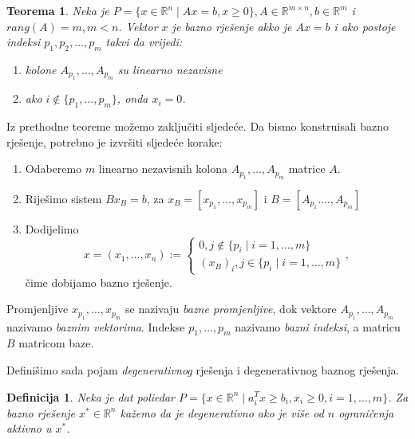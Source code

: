 \documentclass[a4paper, utf8, 11pt, colorlinks]{book}
\newtheorem{definition}{Definicija}[chapter]
\newtheorem{thm}{Teorema}[chapter]
\theoremstyle{definition}
\begin{document}
\begin{thm}
   Neka je $P = \{ x \in \mathbb{R}^n \mid A x = b, x \geq 0\}, A \in \mathbb{R}^{m \times n}, b \in \mathbb{R}^m$ i $rang(A)= m, m < n$.
   Vektor $x$ je bazno rješenje  akko je $A x = b$ i ako postoje indeksi $p_1,p_2,\ldots, p_m$ takvi da vrijedi:
   \begin{enumerate}
       \item kolone $A_{p_1},\ldots, A_{p_m}$ su linearno nezavisne
       \item ako $i \notin \{p_1,\ldots, p_m\}$, onda $x_i = 0$.
   \end{enumerate}
   
\end{thm}
Iz prethodne teoreme možemo zaključiti sljedeće.  Da bismo  konstruisali bazno rješenje, potrebno je izvršiti sljedeće korake:
\begin{enumerate}
    \item Odaberemo $m$ linearno nezavisnih kolona $A_{p_1}, \ldots, A_{p_m}$ matrice $A$.
    \item Riješimo sistem $B x_B = b$, za $x_B = [x_{p_1}, \ldots, x_{p_m}]$ i $B= [A_{p_1}. \ldots, A_{p_m}]$
    \item Dodijelimo $$x = (x_1,\ldots, x_n):= \begin{cases}
    	          0, j  \not   \in \{ p_i \mid i=1,\ldots, m\} \\
    	          (x_B)_i, j \in \{ p_i \mid i=1,\ldots, m\}
    \end{cases},$$  čime dobijamo bazno rješenje. 

\end{enumerate}
 
Promjenljive $x_{p_1},\ldots, x_{p_m}$ se nazivaju \emph{bazne promjenljive}, dok vektore $A_{p_1}, \ldots, A_{p_m}$ nazivamo \emph{baznim vektorima}. Indekse $p_1,\ldots, p_m$ nazivamo \emph{bazni indeksi}, a matricu $B$ matricom baze. 


Definišimo sada pojam \emph{degenerativnog} rješenja i degenerativnog baznog rješenja. 

\begin{definition}
      Neka je dat poliedar $P = \{ x \in \mathbb{R}^n \mid a_i^T x \geq b_i, x_i \geq 0, i=1,\ldots,m \}$. Za bazno rješenje $x^*\in \mathbb{R}^n$ kažemo da je degenerativno ako je više od $n$  ograničenja aktivno u $x^*$. 
      
\end{definition}
\end{document}
